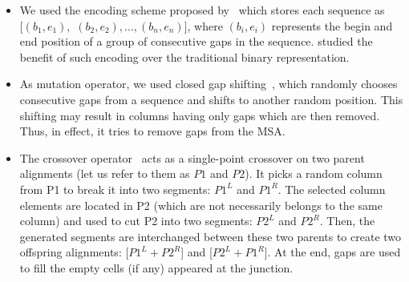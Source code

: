 \begin{itemize}
	\item We used the encoding scheme proposed by~\cite{rubio2016hybrid} which stores each sequence as $[(b_1, e_1),$ $(b_2, e_2), ..., (b_n, e_n)]$, where $(b_i, e_i)$ represents the begin and end position of a group of consecutive gaps in the sequence. \cite{zambrano2017m2align} studied the benefit of such encoding over the traditional binary representation.
	
	\item As mutation operator, we used closed gap shifting~\cite{ortuno2013optimizing}, which randomly chooses consecutive gaps from a sequence and shifts to another random position. This shifting may result in columns having only gaps which are then removed. Thus, in effect, it tries to remove gaps from the MSA. 
	
	\item The crossover operator~\citealp{da2010alineaga} acts as a single-point crossover on two parent alignments (let us refer to them as $ P1 $ and $ P2 $). It picks a random column from P1 to break it into two segments: $ P1^L $ and $ P1^R $. The selected column elements are located in P2 (which are not necessarily belongs to the same column) and used to cut P2 into two segments: $ P2^L $ and $ P2^R $. Then, the generated segments are interchanged between these two parents to create two offspring alignments: [$P1^L + P2^R$] and [$P2^L + P1^R$]. At the end, gaps are used to fill the empty cells (if any) appeared at the junction.
\end{itemize}

